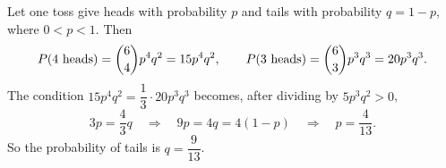 Let one toss give heads with probability $p$ and tails with probability $q=1-p$, where $0<p<1$. Then
\[
P(4\text{ heads})=\dbinom64p^4q^2=15p^4q^2,\qquad P(3\text{ heads})=\dbinom63p^3q^3=20p^3q^3 .
\]
The condition $15p^4q^2=\dfrac{1}{3}\cdot20p^3q^3$ becomes, after dividing by $5p^3q^2>0$,
\[
3p=\dfrac{4}{3}q\quad\Longrightarrow\quad 9p=4q=4(1-p)\quad\Longrightarrow\quad p=\dfrac{4}{13}.
\]
So the probability of tails is $q=\boxed{\dfrac{9}{13}}$.

